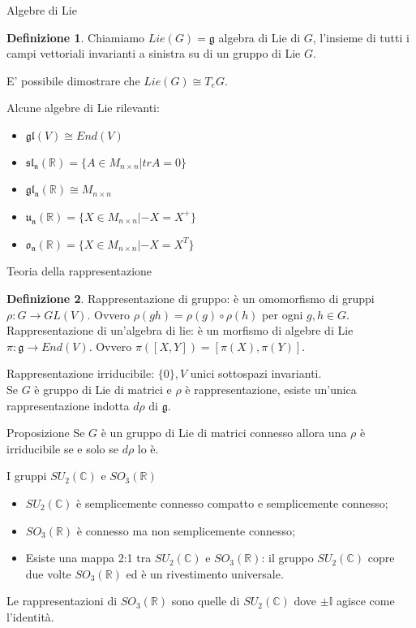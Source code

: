\documentclass{beamer}
\theoremstyle{definition}
\newtheorem{Def}{Definizione}
\theoremstyle{Theorem}
\theoremstyle{definition}
\theoremstyle{definition}
\theoremstyle{definition}
\begin{document}
\begin{frame} {Algebre di Lie}
\begin{Def}
	Chiamiamo $Lie(G)=\mathfrak{g}$ algebra di Lie di $G$, l'insieme di tutti i campi vettoriali invarianti a sinistra su di un gruppo di Lie $G$.
\end{Def}
\begin{alertblock}{}
	E' possibile dimostrare che $Lie(G)\cong T_eG$.
\end{alertblock}
Alcune algebre di Lie rilevanti:
\begin{itemize}
	\item $\mathfrak{gl}(V)\cong End(V)$ 
	\item $\mathfrak{sl_n(\mathbb{R})}=\{A\in M_{n\times n}|trA=0\}$
	\item $\mathfrak{gl_n(\mathbb{R})}\cong M_{n\times n}$
	\item $\mathfrak{u_n(\mathbb{R})}=\{X\in M_{n\times n}|-X=X^+\}$
	\item $\mathfrak{o_n(\mathbb{R})}=\{X\in M_{n\times n}|-X=X^T\}$
\end{itemize}
\end{frame}
\begin{frame} {Teoria della rappresentazione}
	\begin{Def}
		Rappresentazione di gruppo: è un omomorfismo di gruppi $\rho:G\rightarrow GL(V)$. Ovvero $\rho(gh)=\rho(g)\circ\rho(h)$ per ogni $g,h\in G$.
		Rappresentazione di un'algebra di lie: è un morfismo di algebre di Lie $\pi:\mathfrak{g}\rightarrow End(V)$. Ovvero $\pi([X,Y])=[\pi(X),\pi(Y)]$.
	\end{Def}
Rappresentazione irriducibile: $\{0\}, V$ unici sottospazi invarianti.\\
Se $G$ è gruppo di Lie di matrici e $\rho$ è rappresentazione, esiste un'unica rappresentazione indotta $d\rho$ di $\mathfrak{g}$.
\begin{alertblock}{Proposizione}
	Se $G$ è un gruppo di Lie di matrici connesso allora una $\rho$ è irriducibile se e solo se $d\rho$ lo è.  
\end{alertblock}
\end{frame}
\begin{frame} {I gruppi $SU_2(\mathbb{C})$ e $SO_3(\mathbb{R})$}
	\begin{itemize}
		\item $SU_2(\mathbb{C})$ è semplicemente connesso compatto e semplicemente connesso;
		\item $SO_3(\mathbb{R})$ è connesso ma non semplicemente connesso;
		\item Esiste una mappa 2:1 tra $SU_2(\mathbb{C})$ e $SO_3(\mathbb{R})$: il gruppo $SU_2(\mathbb{C})$ copre due volte $SO_3(\mathbb{R})$ ed è un rivestimento universale.
	\end{itemize}
\begin{alertblock}{}
	Le rappresentazioni di $SO_3(\mathbb{R})$ sono quelle di $SU_2(\mathbb{C})$ dove $\pm\mathbb{I}$ agisce come l'identità.
\end{alertblock}
\end{frame}
\end{document}
